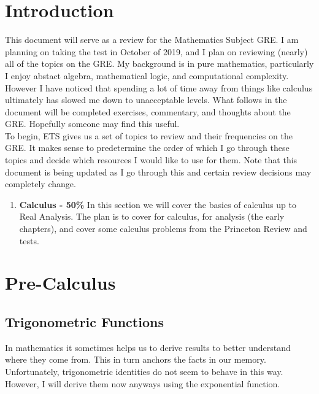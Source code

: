 
\def\name{Daniel Tobias}
\def\assignment{Mathematics GRE Review}
\usepackage{hyperref}
\usepackage{tikz}

\section{Introduction}
This document will serve as a review for the Mathematics Subject GRE. I am planning on taking the test in October of 2019, and I plan on reviewing (nearly) all of the topics on the GRE. My background is in pure mathematics, particularly I enjoy abstact algebra, mathematical logic, and computational complexity. However I have noticed that spending a lot of time away from things like calculus ultimately has slowed me down to unacceptable levels. What follows in the document will be completed exercises, commentary, and thoughts about the GRE. Hopefully someone may find this useful.\\

To begin, ETS gives us a set of topics to review and their frequencies on the GRE. It makes sense to predetermine the order of which I go through these topics and decide which resources I would like to use for them. Note that this document is being updated as I go through this and certain review decisions may completely change.

\begin{enumerate}
	\item \textbf{Calculus - 50\%} In this section we will cover the basics of calculus up to Real Analysis. The plan is to cover \cite{Stewart} for calculus, \cite{Rudin} for analysis (the early chapters), and cover some calculus problems from the Princeton Review and \cite{UC} tests.
\end{enumerate}

\section{Pre-Calculus}
\subsection{Trigonometric Functions}
In mathematics it sometimes helps us to derive results to better understand where they come from. This in turn anchors the facts in our memory. Unfortunately, trigonometric identities do not seem to behave in this way. However, I will derive them now anyways using the exponential function.
